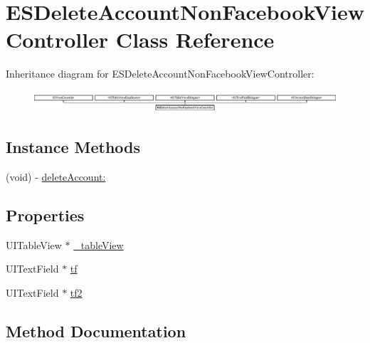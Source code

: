 \hypertarget{interface_e_s_delete_account_non_facebook_view_controller}{}\section{E\+S\+Delete\+Account\+Non\+Facebook\+View\+Controller Class Reference}
\label{interface_e_s_delete_account_non_facebook_view_controller}
Inheritance diagram for E\+S\+Delete\+Account\+Non\+Facebook\+View\+Controller\+:\begin{figure}[H]
\begin{center}
\leavevmode
\includegraphics[height=0.794326cm]{interface_e_s_delete_account_non_facebook_view_controller}
\end{center}
\end{figure}
\subsection*{Instance Methods}
\begin{DoxyCompactItemize}
\item 
(void) -\/ \hyperlink{interface_e_s_delete_account_non_facebook_view_controller_a9be1a11924446fe24dff767a6dadec4c}{delete\+Account\+:}
\end{DoxyCompactItemize}
\subsection*{Properties}
\begin{DoxyCompactItemize}
\item 
U\+I\+Table\+View $\ast$ \hyperlink{interface_e_s_delete_account_non_facebook_view_controller_a083e809280c6fdcd2e37327001da4d17}{\+\_\+table\+View}
\item 
U\+I\+Text\+Field $\ast$ \hyperlink{interface_e_s_delete_account_non_facebook_view_controller_afce770d81c796ef6e625e2ff379de008}{tf}
\item 
U\+I\+Text\+Field $\ast$ \hyperlink{interface_e_s_delete_account_non_facebook_view_controller_a5a7102be99dd08d7efe83c7a1ac163ca}{tf2}
\end{DoxyCompactItemize}


\subsection{Method Documentation}
\hypertarget{interface_e_s_delete_account_non_facebook_view_controller_a9be1a11924446fe24dff767a6dadec4c}{}
